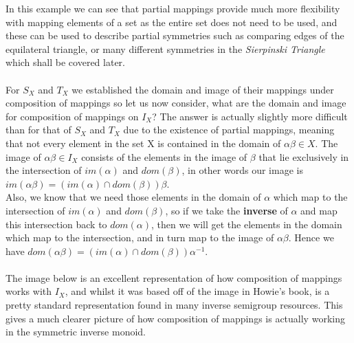 \documentclass[12pt]{article}
\begin{document}
\noindent In this example we can see that partial mappings provide much more flexibility with mapping elements of a set as the entire set does not need to be used, and these can be used to describe partial symmetries such as comparing edges of the equilateral triangle, or many different symmetries in the \textit{Sierpinski Triangle} which shall be covered later. \\
\\For $S_X$ and $T_X$ we established the domain and image of their mappings under composition of mappings so let us now consider, what are the domain and image for composition of mappings on $I_X$? The answer is actually slightly more difficult than for that of $S_X$ and $T_X$ due to the existence of partial mappings, meaning that not every element in the set X is contained in the domain of $\alpha \beta \in X$. The image of $\alpha \beta \in I_X$ consists of the elements in the image of $\beta$ that lie exclusively in the intersection of $im(\alpha)$ and $dom(\beta)$, in other words our image is $im(\alpha\beta)=(im(\alpha) \cap dom(\beta))\beta$.\\
Also, we know that we need those elements in the domain of $\alpha$ which map to the intersection of $im(\alpha)$ and $dom(\beta)$, so if we take the \textbf{inverse} of $\alpha$ and map this intersection back to $dom(\alpha)$, then we will get the elements in the domain which map to the intersection, and in turn map to the image of $\alpha\beta$. Hence we have $dom(\alpha\beta)=(im(\alpha) \cap dom(\beta))\alpha^{-1}$.\\
\\The image below is an excellent representation of how composition of mappings works with $I_X$, and whilst it was based off of the image in Howie's book, is a pretty standard representation found in many inverse semigroup resources. This gives a much clearer picture of how composition of mappings is actually working in the symmetric inverse monoid.
\end{document}
